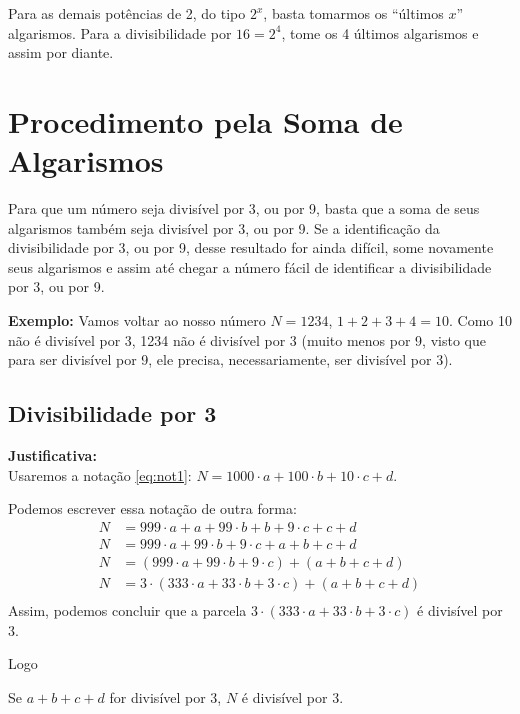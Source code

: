 \documentclass[12pt,a4paper]{article}
\begin{document}
		Para as demais potências de 2, do tipo $2^x$, basta tomarmos os ``últimos $x$'' algarismos. Para a divisibilidade por $16 = 2^4$, tome os 4 últimos algarismos e assim por diante.
		
		\section{Procedimento pela Soma de Algarismos}
		\label{sec:soma}
		
		Para que um número seja divisível por 3, ou por 9, basta que a soma de seus algarismos também seja divisível por 3, ou por 9. Se a identificação da divisibilidade por 3, ou por 9, desse resultado for ainda difícil, some novamente seus algarismos e assim até chegar a número fácil de identificar a divisibilidade por 3, ou por 9.
		
		\textbf{Exemplo:} Vamos voltar ao nosso número $N = 1234$, $1+2+3+4 = 10$. Como 10 não é divisível por 3, 1234 não é divisível por 3 (muito menos por 9, visto que para ser divisível por 9, ele precisa, necessariamente, ser divisível por 3).
		
		\newpage
		
		\subsection{Divisibilidade por 3}
		
		\textbf{Justificativa:}\\
		Usaremos a notação \ref{eq:not1}: $N = 1000 \cdot a + 100 \cdot b + 10 \cdot c + d$. 
		
		Podemos escrever essa notação de outra forma:
		\begin{align*}
			N &= 999 \cdot a + a + 99 \cdot b +b + 9 \cdot c + c + d\\
			N &= 999 \cdot a + 99 \cdot b + 9 \cdot c + a + b + c + d\\
			N &= (999 \cdot a + 99 \cdot b + 9 \cdot c) + (a + b + c + d)\\
			N &= 3 \cdot (333 \cdot a + 33 \cdot b + 3 \cdot c) + (a + b + c + d)\\
		\end{align*}
		Assim, podemos concluir que a parcela $3 \cdot (333 \cdot a + 33 \cdot b + 3 \cdot c)$ é divisível por 3.
		
		Logo
		
		\begin{meudestaque}
			Se $a+b+c+d$ for divisível por 3, $N$ é divisível por 3.
		\end{meudestaque}
		
\end{document}
